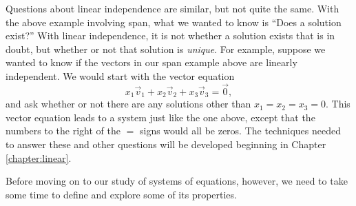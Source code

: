 Questions about linear independence are similar, but not quite the same. With the above example involving span, what we wanted to know is ``Does a solution exist?'' With linear independence, it is not whether a solution exists that is in doubt, but whether or not that solution is \textit{unique}. For example, suppose we wanted to know if the vectors in our span example above are linearly independent. We would start with the vector equation
\[
x_1\vec{v}_1+x_2\vec{v}_2+x_3\vec{v}_3 = \vec 0,
\]
and ask whether or not there are any solutions other than $x_1=x_2=x_3=0$. This vector equation leads to a system just like the one above, except that the numbers to the right of the $=$ signs would all be zeros. The techniques needed to answer these and other questions will be developed beginning in Chapter \ref{chapter:linear}.

Before moving on to our study of systems of equations, however, we need to take some time to define  and explore some of its properties.

